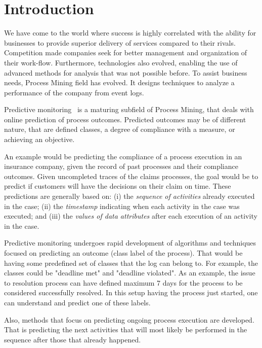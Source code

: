 

\section{Introduction} %
\label{sec:introduction}


We have come to the world where success is highly correlated with the ability for businesses to provide superior delivery of services compared to their rivals. Competition made companies seek for better management and organization of their work-flow. Furthermore, technologies also evolved, enabling the use of advanced methods for analysis that was not possible before. To assist business needs, Process Mining field has evolved. It designs techniques to analyze a performance of the company from event logs.  

Predictive monitoring~\cite{Maggi:CAiSE2014} is a maturing subfield of Process Mining, that deals with online prediction of process outcomes. Predicted outcomes may be of different nature, that are defined classes, a degree of compliance with a measure, or achieving an objective.

An example would be predicting the compliance of a process execution in an insurance company, given the record of past processes and their compliance outcomes. Given uncompleted traces of the claims processes, the goal would be to predict if customers will have the decisions on their claim on time. These predictions are generally based on: (i) the \emph{sequence of activities} already executed in the case; (ii) the \emph{timestamp} indicating when each activity in the case was executed; and (iii) the \emph{values of data attributes} after each execution of an activity in the case.



Predictive monitoring undergoes rapid development of algorithms and techniques focused on predicting an outcome (class label of the process). That would be having some predefined set of classes that the log can belong to. For example, the classes could be "deadline met" and "deadline violated". As an example, the issue to resolution process can have defined maximum 7 days for the process to be considered successfully resolved. In this setup having the process just started, one can understand and predict one of these labels. 

Also, methods that focus on predicting ongoing process execution are developed. That is predicting the next activities that will most likely be performed in the sequence after those that already happened. 

